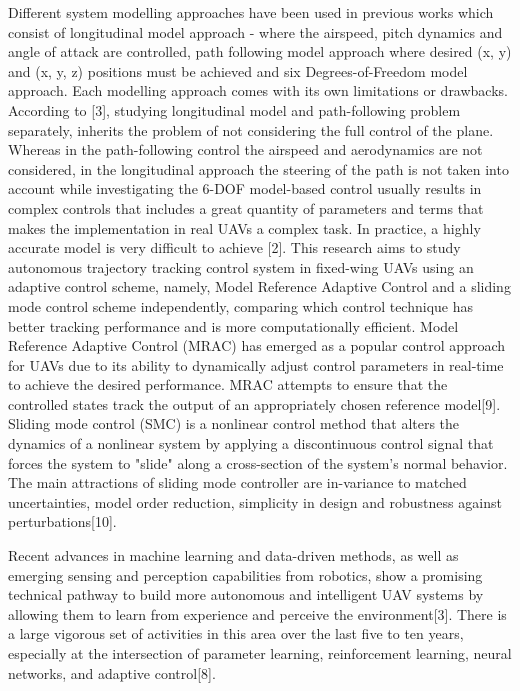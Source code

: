 \documentclass[12pt]{article}
\begin{document}
Different system modelling approaches have been used in previous works which consist of longitudinal model approach - where the airspeed, pitch dynamics and angle of attack are controlled, path following model approach where desired (x, y) and (x, y, z) positions must be achieved and six Degrees-of-Freedom model approach. Each modelling approach comes with its own limitations or drawbacks. According to [3], studying longitudinal model and path-following problem separately, inherits the problem of not considering the full control of the plane. Whereas in the path-following control the airspeed and aerodynamics are not considered, in the longitudinal approach the steering of the path is not taken into account while investigating the 6-DOF model-based control usually results in complex controls that includes a great quantity of parameters and terms that makes the implementation in real UAVs a complex task. In practice, a highly accurate model is very difficult to achieve [2].
This research aims to study autonomous trajectory tracking control system in fixed-wing UAVs using an adaptive control scheme, namely, Model Reference Adaptive Control and a sliding mode control scheme independently, comparing which control technique has better tracking performance and is more computationally efficient. Model Reference Adaptive Control (MRAC) has emerged as a popular control approach for UAVs due to its ability to dynamically adjust control parameters in real-time to achieve the desired performance. MRAC attempts to ensure that the controlled states track the output of an appropriately chosen reference model[9]. Sliding mode control (SMC) is a nonlinear control method that alters the dynamics of a nonlinear system by applying a discontinuous control signal that forces the system to "slide" along a cross-section of the system's normal behavior. The main attractions of sliding mode controller are in-variance to matched uncertainties, model order reduction, simplicity in design and robustness against perturbations[10].

Recent advances in machine learning and data-driven methods, as well as emerging sensing and perception capabilities from robotics, show a promising technical pathway to build more autonomous and intelligent UAV systems by allowing them to learn from experience and perceive the environment[3]. There is a large vigorous set of activities in this area over the last five to ten years, especially at the intersection of parameter learning, reinforcement learning, neural networks, and adaptive control[8].
\end{document}
